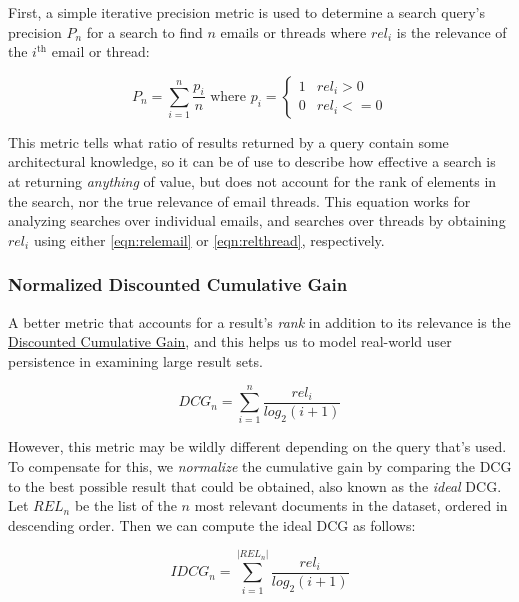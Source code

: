 \documentclass[a4paper, 12pt]{article}
\begin{document}
			First, a simple iterative precision metric is used to determine a search query's precision $ P_n $ for a search to find $ n $ emails or threads where $ rel_i $ is the relevance of the $ i^{\text{th}} $ email or thread:
			
			\begin{equation}
				\tag{Search Precision}
				P_n = \sum_{i = 1}^{n} \frac{p_i}{n}
				\text{ where } p_i =
				\begin{cases}
					1 & rel_i > 0 \\
					0 & rel_i <= 0
				\end{cases}
				\label{eqn:precision}
			\end{equation}
		
			This metric tells what ratio of results returned by a query contain some architectural knowledge, so it can be of use to describe how effective a search is at returning \textit{anything} of value, but does not account for the rank of elements in the search, nor the true relevance of email threads. This equation works for analyzing searches over individual emails, and searches over threads by obtaining $ rel_i $ using either \eqref{eqn:relemail} or \eqref{eqn:relthread}, respectively.
			
		\subsubsection{Normalized Discounted Cumulative Gain}
			A better metric that accounts for a result's \textit{rank} in addition to its relevance is the \href{}{Discounted Cumulative Gain}, and this helps us to model real-world user persistence in examining large result sets\autocite{jarvelin}.

			\begin{equation}
				\tag{DCG}
				DCG_n = \sum_{i=1}^{n} \frac{rel_i}{log_2(i + 1)}
				\label{eqn:dcg}
			\end{equation}
			
			However, this metric may be wildly different depending on the query that's used. To compensate for this, we \textit{normalize} the cumulative gain by comparing the DCG to the best possible result that could be obtained, also known as the \textit{ideal} DCG\autocite{stanfordslides}. Let $ REL_n $ be the list of the $ n $ most relevant documents in the dataset, ordered in descending order. Then we can compute the ideal DCG as follows:
			
			\begin{equation}
				\tag{IDCG}
				IDCG_n = \sum_{i=1}^{|REL_n|} \frac{rel_i}{log_2(i + 1)}
				\label{eqn:idcg}
			\end{equation}
		
\end{document}
